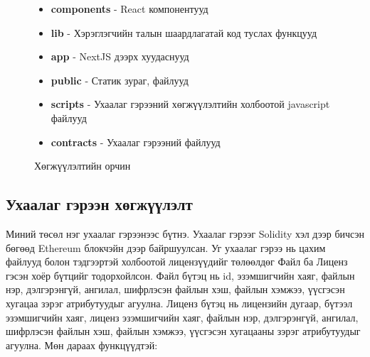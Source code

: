 \begin{figure}[htbp]
\begin{minipage}[ht]{0.4\textwidth}
       \caption{Хөгжүүлэлтийн орчин}
   \end{minipage}
   \begin{minipage}[h!t]{0.5\textwidth}
      \raggedright
      \begin{itemize}
         \item \textbf{components} - React компонентууд
         \item \textbf{lib} - Хэрэглэгчийн талын шаардлагатай код туслах функцууд
         \item \textbf{app} - NextJS дээрх хуудаснууд
         \item \textbf{public} - Статик зураг, файлууд
         \item \textbf{scripts} - Ухаалаг гэрээний хөгжүүлэлтийн холбоотой  javascript файлууд
         \item \textbf{contracts} - Ухаалаг гэрээний файлууд
      \end{itemize}
  \end{minipage}
\end{figure}

\subsection{Ухаалаг гэрээн хөгжүүлэлт}
Миний төсөл нэг ухаалаг гэрээнээс бүтнэ. Ухаалаг гэрээг Solidity хэл дээр бичсэн бөгөөд Ethereum  блокчэйн дээр байршуулсан. Уг ухаалаг гэрээ нь цахим файлууд болон тэдгээртэй холбоотой лицензүүдийг төлөөлдөг Файл ба Лиценз гэсэн хоёр бүтцийг тодорхойлсон. Файл бүтэц  нь id, эзэмшигчийн хаяг, файлын нэр, дэлгэрэнгүй, ангилал, шифрлэсэн файлын хэш, файлын хэмжээ, үүсгэсэн хугацаа зэрэг атрибутуудыг агуулна. Лиценз бүтэц нь лицензийн дугаар, бүтээл эзэмшигчийн хаяг, лиценз эзэмшигчийн хаяг, файлын нэр, дэлгэрэнгүй, ангилал, шифрлэсэн файлын хэш, файлын хэмжээ, үүсгэсэн хугацааны  зэрэг атрибутуудыг агуулна.
Мөн дараах функцүүдтэй:

